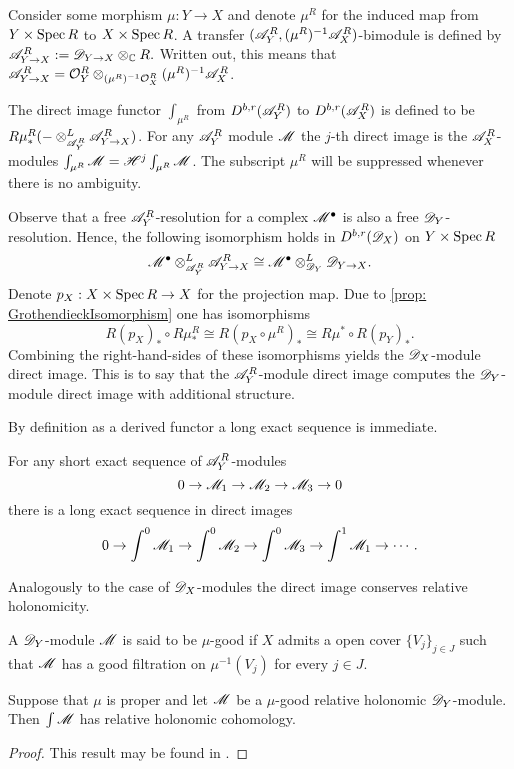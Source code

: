     Consider some morphism $\mu:Y\to X$ and denote $\mu^R$ for the induced map from $Y\times \operatorname{Spec} R$ to $X\times \operatorname{Spec} R$.
    A transfer $(\mathscr{A}_Y^R,(\mu^R)^{-1}\mathscr{A}_X^R)$-bimodule is defined by $\mathscr{A}_{Y\to X}^R:= \mathscr{D}_{Y\to X}\otimes_{\mathbb{C}} R .$ Written out, this means that $\mathscr{A}_{Y\to X}^R = \mathcal{O}_Y^R \otimes_{(\mu^R)^{-1}\mathcal{O}_X^R}(\mu^R)^{-1}\mathscr{A}_X^R$.
    \begin{definition}
      The direct image functor $\int_{\mu^R}$ from $D^{b,r}(\mathscr{A}_Y^R)$ to $D^{b,r}(\mathscr{A}_X^R)$ is defined to be $R\mu^R_* ({-}\otimes_{\mathscr{A}_Y^R}^L \mathscr{A}_{Y\to X}^R)$.
      For any $\mathscr{A}_Y^R$ module $\mathscr{M}$ the $j$-th direct image is the $\mathscr{A}_X^R$-modules $\int_{\mu^R} \mathscr{M} = \mathscr{H}^j \int_{\mu^R} \mathscr{M}$.
      The subscript $\mu^R$ will be suppressed whenever there is no ambiguity.
    \end{definition}
    Observe that a free $\mathscr{A}_Y^R$-resolution for a complex $\mathscr{M}^\bullet$ is also a free $\mathscr{D}_Y$-resolution.
    Hence, the following isomorphism holds in $D^{b,r}(\mathscr{D}_X)$ on $Y\times \operatorname{Spec} R$
    $$\mathscr{M}^\bullet \otimes_{\mathscr{A}_Y^R}^L \mathscr{A}_{Y\to X}^R \cong \mathscr{M}^\bullet \otimes_{\mathscr{D}_Y}^L \mathscr{D}_{Y\to X}.$$
    Denote $p_X:X\times \operatorname{Spec} R \to X$ for the projection map.
    Due to \cref{prop: GrothendieckIsomorphism} one has isomorphisms
    $$R(p_X)_* \circ R\mu^R_* \cong R(p_X \circ \mu^R)_* \cong R\mu^* \circ R(p_Y)_*.$$
    Combining the right-hand-sides of these isomorphisms yields the $\mathscr{D}_X$-module direct image.
    This is to say that the $\mathscr{A}_Y^R$-module direct image computes the $\mathscr{D}_Y$-module direct image with additional structure.

    By definition as a derived functor a long exact sequence is immediate.
    \begin{proposition}
        For any short exact sequence of $\mathscr{A}_Y^R$-modules
        $$0\to \mathscr{M}_1 \to \mathscr{M}_2 \to \mathscr{M}_3 \to 0$$
        there is a long exact sequence in direct images
        $$0\to \int^0 \mathscr{M}_1 \to \int^0 \mathscr{M}_2 \to \int^0 \mathscr{M}_3 \to \int^1 \mathscr{M}_1 \to \cdots. $$
    \end{proposition}
    Analogously to the case of $\mathscr{D}_X$-modules the direct image conserves relative holonomicity.
  \begin{definition}
      A $\mathscr{D}_Y$-module $\mathscr{M}$ is said to be $\mu$-good if $X$ admits a open cover $\{V_j\}_{j\in J}$ such that $\mathscr{M}$ has a good filtration on $\mu^{-1}(V_j)$ for every $j\in J$.
  \end{definition}
  \begin{theorem}\label{thm: RelHolConserved}
      Suppose that $\mu$ is proper and let $\mathscr{M}$ be a $\mu$-good relative holonomic $\mathscr{D}_Y$-module. Then $\int \mathscr{M}$ has relative holonomic cohomology.
  \end{theorem}
  \begin{proof}
      This result may be found in \cite[Theorem 1.17]{monteiro2016riemann}.
  \end{proof}
